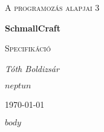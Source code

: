 \documentclass{article}
\begin{document}
\begin{titlepage}
    \centering
    {\scshape\LARGE A programozás alapjai 3 \par}
    \vspace{1.5cm}
    {\huge\bfseries SchmallCraft \par}
    {\scshape\Large Specifikáció \par}
    \vspace{2cm}
    {\Large\itshape Tóth Boldizsár \par}
	{\Large\itshape $neptun$ \par}
    \vfill
    {\large {}\today\par}
\end{titlepage}

$body$
\end{document}
